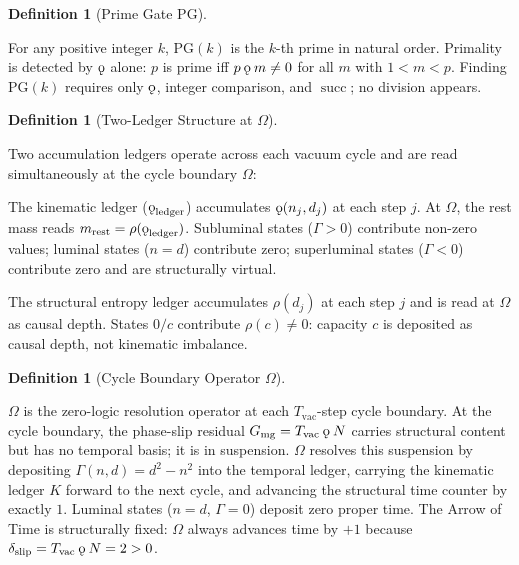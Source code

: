\documentclass[11pt,letterpaper]{article}
\theoremstyle{plain}
\theoremstyle{definition}
\newtheorem{definition}[theorem]{Definition}
\theoremstyle{remark}
\renewcommand{\succ}{\operatorname{succ}}
\newcommand{\rank}{\rho}
\newcommand{\koppa}{\mathbin{\text{\rm\k{o}}}}
\newcommand{\Tcharge}{\Gamma}
\newcommand{\PG}{\mathrm{PG}}
\newcommand{\Gmg}{G_{\mathrm{mg}}}
\newcommand{\dslip}{\delta_{\mathrm{slip}}}
\newcommand{\Tvac}{T_{\mathrm{vac}}}
\begin{document}
\begin{definition}[Prime Gate $\PG$]\label{def:PG}
\begin{rsbox}
For any positive integer $k$, $\PG(k)$ is the $k$-th prime in
natural order.  Primality is detected by $\koppa$ alone: $p$ is prime
iff $p\koppa m\neq0$ for all $m$ with $1<m<p$.  Finding $\PG(k)$
requires only $\koppa$, integer comparison, and $\succ$; no division
appears.
\end{rsbox}
\end{definition}

\begin{definition}[Two-Ledger Structure at
$\Omega$]\label{def:ledgers}
\begin{rsbox}
Two accumulation ledgers operate across each vacuum cycle and are read
simultaneously at the cycle boundary $\Omega$:

The kinematic ledger ($\koppa_{\mathrm{ledger}}$) accumulates $\koppa(n_j,d_j)$ at each step $j$. At $\Omega$, the rest mass reads $m_{\mathrm{rest}}=\rank(\koppa_{\mathrm{ledger}})$. Subluminal states ($\Tcharge>0$) contribute non-zero values; luminal states ($n=d$) contribute zero; superluminal states ($\Tcharge<0$) contribute zero and are structurally virtual.

The structural entropy ledger accumulates $\rank(d_j)$ at each step $j$ and is read at $\Omega$ as causal depth. States $0/c$ contribute $\rank(c)\neq0$: capacity $c$ is deposited as causal depth, not kinematic imbalance.
\end{rsbox}
\end{definition}

\begin{definition}[Cycle Boundary Operator
$\Omega$]\label{def:omega}
\begin{rsbox}
$\Omega$ is the zero-logic resolution operator at each
$\Tvac$-step cycle boundary.  At the cycle boundary, the phase-slip
residual $\Gmg=\Tvac\koppa N$ carries structural content but has no
temporal basis; it is in suspension.  $\Omega$ resolves this suspension by depositing $\Tcharge(n,d)=d^2-n^2$ into the temporal ledger, carrying the kinematic ledger $K$ forward to the next cycle, and advancing the structural time counter by exactly $1$.
Luminal states ($n=d$, $\Tcharge=0$) deposit zero proper time.  The
Arrow of Time is structurally fixed: $\Omega$ always advances time by
$+1$ because $\dslip=\Tvac\koppa N=2>0$.
\end{rsbox}
\end{definition}
\end{document}
